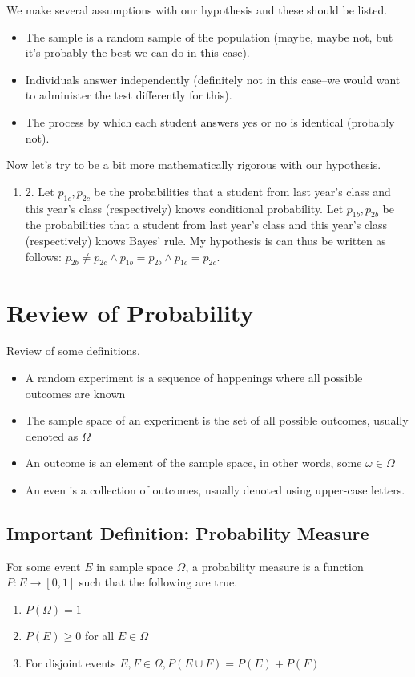 \documentclass[10pt]{article}
\newenvironment{mitemize}
{
  \begin{itemize}
  \setlength{\itemsep}{1pt}
  \setlength{\parskip}{0pt}
  \setlength{\parsep}{0pt}}{\end{itemize}
}
\newenvironment{menumerate}
{
  \begin{enumerate}
  \setlength{\itemsep}{1pt}
  \setlength{\parskip}{0pt}
  \setlength{\parsep}{0pt}}{\end{enumerate}
}
\begin{document}
We make several assumptions with our hypothesis and these should be listed.
\begin{mitemize}
\item The sample is a random sample of the population (maybe, maybe not, but it's probably the best we can do in this case).
\item Individuals answer independently (definitely not in this case--we would want to administer the test differently for this).
\item The process by which each student answers yes or no is identical (probably not).
\end{mitemize}

Now let's try to be a bit more mathematically rigorous with our hypothesis.
\begin{menumerate}
\item[2.] Let $p_{1c}, p_{2c}$ be the probabilities that a student from last year's class and this year's class (respectively) knows conditional probability. Let $p_{1b}, p_{2b}$ be the probabilities that a student from last year's class and this year's class (respectively) knows Bayes' rule. My hypothesis is can thus be written as follows: $p_{2b} \neq p_{2c} \land p_{1b} = p_{2b} \land p_{1c} = p_{2c}$.
\end{menumerate}

\section*{Review of Probability}
Review of some definitions.
\begin{mitemize}
\item A random experiment is a sequence of happenings where all possible outcomes are known
\item The sample space of an experiment is the set of all possible outcomes, usually denoted as $\Omega$
\item An outcome is an element of the sample space, in other words, some $\omega \in \Omega$
\item An even is a collection of outcomes, usually denoted using upper-case letters.
\end{mitemize}

\subsection*{Important Definition: Probability Measure}
For some event $E$ in sample space $\Omega$, a probability measure is a function $P \colon E \rightarrow [0,1]$ such that the following are true.
\begin{menumerate}
\item $P(\Omega) = 1$
\item $P(E) \geq 0$ for all $E \in \Omega$
\item For disjoint events $E, F \in \Omega, P(E \cup F) = P(E) + P(F)$ 
\end{menumerate}
\end{document}
